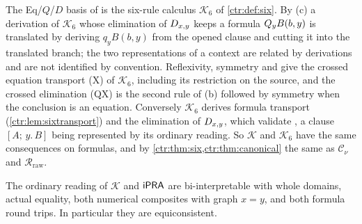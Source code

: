 The Eq/$Q$/$D$ basis of  is the six-rule calculus
$\mathcal K_6$ of \cref{ctr:def:six}. By (c) a derivation of $\mathcal K_6$
whose elimination of $D_{x,y}$ keeps a formula $Q_{y}B(b,y)$ is
translated by deriving $q_yB(b,y)$ from the opened clause and cutting it
into the translated branch; the two representations of a context are
related by derivations and are not identified by convention. Reflexivity,
symmetry and  give the crossed equation transport (X) of
$\mathcal K_6$, including its restriction on the source, and the crossed
elimination (QX) is the second rule of (b) followed by symmetry when the
conclusion is an equation. Conversely $\mathcal K_6$ derives formula
transport (\cref{ctr:lem:sixtransport}) and the elimination of $D_{x,y}$,
which validate , a clause $[A;\,y.\,B]$ being represented by
its ordinary reading. So $\mathcal K$ and $\mathcal K_6$ have the same
consequences on formulas, and by \cref{ctr:thm:six,ctr:thm:canonical} the
same as $\mathcal C_\nu$ and $\mathcal R_{\mathrm{raw}}$.

\begin{theorem}
\label{disch:thm:sd-ipra}
The ordinary reading of $\mathcal K$ and $\mathsf{iPRA}$ are bi-interpretable with
whole domains, actual equality, both numerical composites with graph
$x=y$, and both formula round trips. In particular they are equiconsistent.
\end{theorem}

